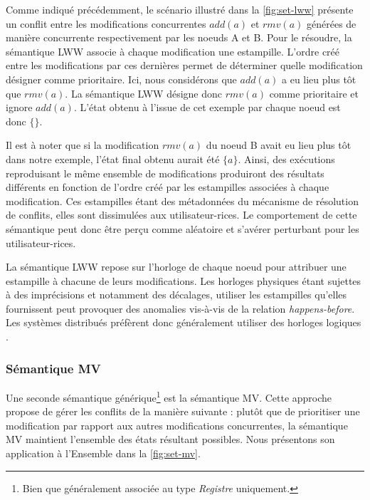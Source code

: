 \documentclass[12pt]{thesul}
\newcommand{\hb}{\emph{happens-before}\xspace}
\newcommand{\trm}[1]{\mathit{#1}}
\begin{document}
Comme indiqué précédemment, le scénario illustré dans la \autoref{fig:set-lww} présente un conflit entre les modifications concurrentes $\trm{add}(a)$ et $\trm{rmv}(a)$ générées de manière concurrente respectivement par les noeuds A et B.
Pour le résoudre, la sémantique \ac{LWW} associe à chaque modification une estampille.
L'ordre créé entre les modifications par ces dernières permet de déterminer quelle modification désigner comme prioritaire.
Ici, nous considérons que $\trm{add}(a)$ a eu lieu plus tôt que $\trm{rmv}(a)$.
La sémantique \ac{LWW} désigne donc $\trm{rmv}(a)$ comme prioritaire et ignore $\trm{add}(a)$.
L'état obtenu à l'issue de cet exemple par chaque noeud est donc $\{\}$.

Il est à noter que si la modification $\trm{rmv}(a)$ du noeud B avait eu lieu plus tôt dans notre exemple, l'état final obtenu aurait été $\{a\}$.
Ainsi, des exécutions reproduisant le même ensemble de modifications produiront des résultats différents en fonction de l'ordre créé par les estampilles associées à chaque modification.
Ces estampilles étant des métadonnées du mécanisme de résolution de conflits, elles sont dissimulées aux utilisateur-rices.
Le comportement de cette sémantique peut donc être perçu comme aléatoire et s'avérer perturbant pour les utilisateur-rices.

La sémantique \ac{LWW} repose sur l'horloge de chaque noeud pour attribuer une estampille à chacune de leurs modifications.
Les horloges physiques étant sujettes à des imprécisions et notamment des décalages, utiliser les estampilles qu'elles fournissent peut provoquer des anomalies vis-à-vis de la relation \hb.
Les systèmes distribués préfèrent donc généralement utiliser des horloges logiques \cite{1978-happen-before-lamport}.

\subsubsection{Sémantique \acl{MV}}

Une seconde sémantique générique\footnote{Bien que généralement associée au type \emph{Registre} uniquement.} est la sémantique \acf{MV}.
Cette approche propose de gérer les conflits de la manière suivante : plutôt que de prioritiser une modification par rapport aux autres modifications concurrentes, la sémantique \ac{MV} maintient l'ensemble des états résultant possibles.
Nous présentons son application à l'Ensemble dans la \autoref{fig:set-mv}.
\end{document}
